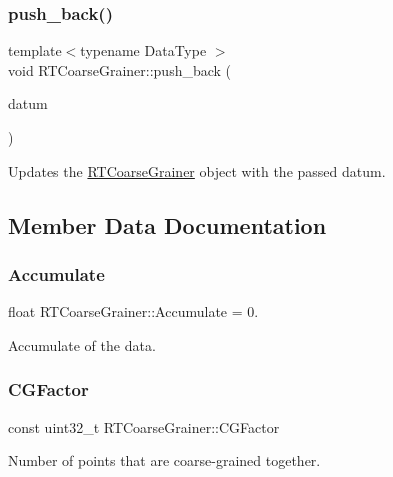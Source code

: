 \subsubsection{\texorpdfstring{push\+\_\+back()}{push\_back()}}
{\footnotesize\ttfamily template$<$typename Data\+Type $>$ \\
void R\+T\+Coarse\+Grainer\+::push\+\_\+back (\begin{DoxyParamCaption}\item[{const Data\+Type}]{datum }\end{DoxyParamCaption})\hspace{0.3cm}{\ttfamily [inline]}}



Updates the {\ttfamily \hyperlink{classRTCoarseGrainer}{R\+T\+Coarse\+Grainer}} object with the passed datum. 



\subsection{Member Data Documentation}
\mbox{\label{classRTCoarseGrainer_a7912b13e79da3e88b1ea1c4067be7e08}} 
\subsubsection{\texorpdfstring{Accumulate}{Accumulate}}
{\footnotesize\ttfamily float R\+T\+Coarse\+Grainer\+::\+Accumulate = 0.}



Accumulate of the data. 

\mbox{\label{classRTCoarseGrainer_a99dc7fa0624717d9ec0a3b1786dfb89a}} 
\subsubsection{\texorpdfstring{C\+G\+Factor}{CGFactor}}
{\footnotesize\ttfamily const uint32\+\_\+t R\+T\+Coarse\+Grainer\+::\+C\+G\+Factor}



Number of points that are coarse-\/grained together. 

